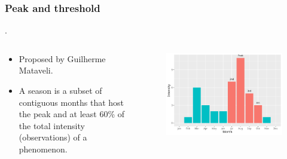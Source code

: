 \documentclass[aspectratio=169]{beamer}
\begin{document}
\begin{frame}
    \frametitle{Peak and threshold}.
    \begin{columns}
        \begin{column}{0.5\linewidth}
            \begin{itemize}
                \item Proposed by Guilherme Mataveli.
                \item A season is a subset of contiguous months that host the
                    peak and at least 60\% of the total intensity
                    (observations) of a phenomenon.
            \end{itemize}
        \end{column}
        \begin{column}{0.5\linewidth}
            \begin{figure}[h]
                \includegraphics[width=0.99\linewidth]
                {./images/peak_thres_hist.png}
            \end{figure}
        \end{column}
    \end{columns}
\end{frame}

\end{document}
